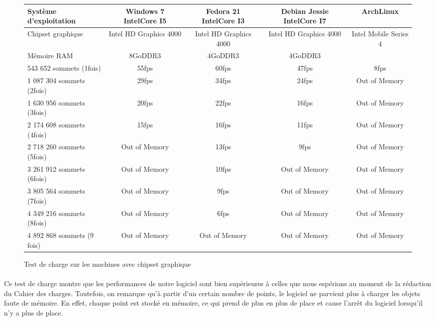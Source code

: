 \begin{figure}[h]
  \begin{changemargin}{-4cm}{-4cm}
    \centering
    \begin{tabular}{|l|c|c|c|c|}
      \hline
      Système d'exploitation & Windows 7 IntelCore I5 & Fedora 21 IntelCore I3 & Debian Jessie IntelCore I7 & ArchLinux\\ \hline
      Chipset graphique &  Intel HD Graphics 4000 & Intel HD Graphics 4000 & Intel HD Graphics 4000 & Intel Mobile Series 4 \\ \hline
      Mémoire RAM & 8GoDDR3 & 4GoDDR3 & 4GoDDR3 & \\ \hline \hline
      543 652 sommets (1fois) & 55fps & 60fps & 47fps & 8fps\\ \hline
      1 087 304 sommets (2fois) & 29fps & 34fps & 24fps & Out of Memory\\ \hline
      1 630 956 sommets (3fois) & 20fps & 22fps & 16fps & Out of Memory \\ \hline
      2 174 608 sommets (4fois) & 15fps & 16fps & 11fps & Out of Memory \\ \hline
      2 718 260 sommets (5fois) & Out of Memory & 13fps & 9fps & Out of Memory \\ \hline
      3 261 912 sommets (6fois) & Out of Memory & 10fps & Out of Memory & Out of Memory \\ \hline
      3 805 564 sommets (7fois) & Out of Memory & 9fps & Out of Memory & Out of Memory \\ \hline
      4 349 216 sommets (8fois) & Out of Memory & 6fps & Out of Memory & Out of Memory \\ \hline
      4 892 868 sommets (9 fois) & Out of Memory & Out of Memory & Out of Memory & Out of Memory \\ \hline
    \end{tabular}
  \end{changemargin}
  \caption{Test de charge sur les machines avec chipset graphique}
  \label{tab:fps_chip}
\end{figure}

\paragraph{}
Ce test de charge montre que les performances de notre logiciel sont bien supérieures à celles que nous espérions au moment de la rédaction du Cahier des charges. Toutefois, on remarque qu'à partir d'un certain nombre de points, le logiciel ne parvient plus à charger les objets faute de mémoire. En effet, chaque point est stocké en mémoire, ce qui prend de plus en plus de place et cause l'arrêt du logiciel lorsqu'il n'y a plus de place. 

